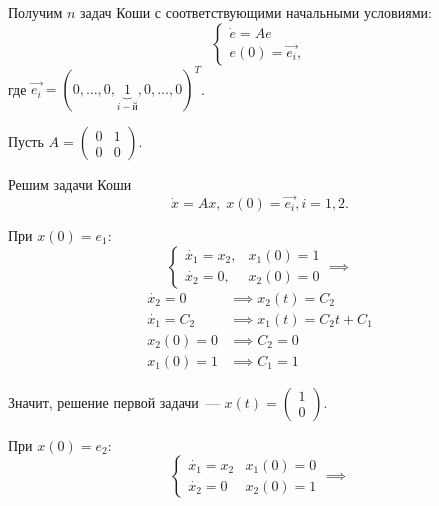 Получим $n$ задач Коши с соответствующими начальными условиями:
\begin{equation*}
    \begin{cases}
        \dot{e} = A e \\
        e(0) = \vec{e_i},
    \end{cases}
\end{equation*}
где $\vec{e_i} = (0, \ldots, 0, \underbrace{1}_{i-\text{й}}, 0, \ldots, 0)^T$.

\begin{exmp}
    Пусть $A = \left( \begin{matrix}
        0 & 1 \\
        0 & 0
    \end{matrix} \right).$

    Решим задачи Коши
    \begin{equation*}
        \dot{x} = Ax, \; x(0) = \vec{e_i}, i = 1, 2.
    \end{equation*}

    При $x(0) = e_1$:
    \begin{equation*}
        \begin{cases}
            \dot{x_1} = x_2, & x_1(0) = 1 \\
            \dot{x_2} = 0, & x_2(0) = 0 
        \end{cases} \implies
    \end{equation*}
    \begin{align*}
        \dot{x_2} = 0 &\implies x_2(t) = C_2 \\
        \dot{x_1} = C_2 &\implies x_1(t) = C_2 t + C_1 \\
        x_2(0) = 0 &\implies C_2 = 0 \\
        x_1(0) = 1 &\implies C_1 = 1
    \end{align*}

    Значит, решение первой задачи~---
    $x(t) = \left( \begin{matrix}
        1 \\
        0
    \end{matrix} \right)$.

    При $x(0) = e_2$:
    \begin{equation*}
        \begin{cases}
            \dot{x_1} = x_2 & x_1(0) = 0 \\
            \dot{x_2} = 0 & x_2(0) = 1
        \end{cases} \implies 
    \end{equation*}
        

\end{exmp}
